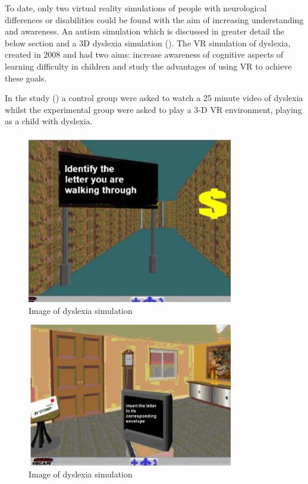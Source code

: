 \documentclass[11pt]{report}
\begin{document}
To date, only two virtual reality simulations of people with neurological differences or disabilities could be found with the aim of increasing understanding and awareness. An autism simulation which is discussed in greater detail the below section and a 3D dyslexia simulation (\cite{dyslexicsimpar}). The VR simulation of dyslexia, created in 2008 and had two aims: increase awareness of cognitive aspects of learning difficulty in children and study the advantages of using VR to achieve these goals. 

In the study (\cite{dyslexicsimpar}) a control group were asked to watch a 25 minute video of dyslexia whilst the experimental group were asked to play a 3-D VR environment, playing as a child with dyslexia.

\begin{figure}[H]
\centering
\includegraphics[width=90mm]{images/litreview/dsim1.png}
\caption{Image of dyslexia simulation}
\label{autisim1}
\end{figure}

\begin{figure}[H]
\centering
\includegraphics[width=90mm]{images/litreview/dsim2.png}
\caption{Image of dyslexia simulation}
\label{autisim1}
\end{figure}
\end{document}
